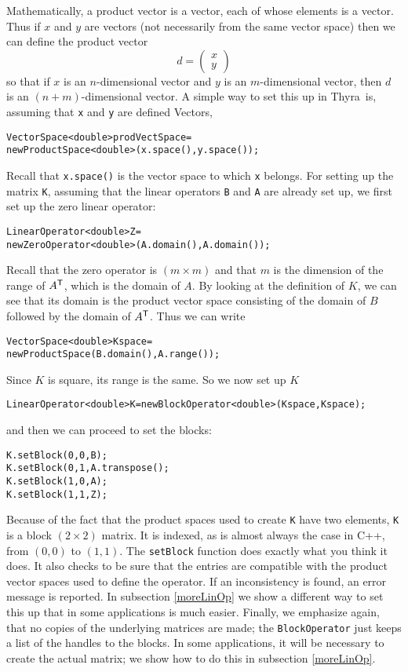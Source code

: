 \documentclass[12pt]{article}
\newcommand{\bd}{\begin{displaymath}}
\newcommand{\ed}{\end{displaymath}}
\newcommand{\trp}{^{\sf T}}
\newcommand{\bry}{\begin{array}}
\newcommand{\ery}{\end{array}}
\newcommand{\thyra}{{\sf Thyra}}
\newcommand{\cpp}{{\sf C++}}
\renewcommand{\vector}{{\sf Vector}}
\newcommand{\lcode}[1]{{\tt #1}}
\newenvironment{dcode}{  \begin{center} 
    \begin{minipage}{.9\textwidth}
     \begin{alltt}}
{\end{alltt}
    \end{minipage}
  \end{center}}
\newcommand{\bdcode}{\begin{dcode}}
\newcommand{\edcode}{\end{dcode}}
\begin{document}
Mathematically, a product vector is a vector, each of whose
elements is a vector.  Thus if $x$ and $y$ are vectors (not
necessarily from the same vector space) then we can define the product
vector
\bd
     d = \left( \bry{c} x \\ y \ery \right)
\ed
so that if $x$ is an $n$-dimensional vector and $y$ is an
$m$-dimensional vector, then $d$ is an $(n+ m)$-dimensional vector.  A
simple way to set this up in \thyra\ is, assuming that \lcode{x} and
\lcode{y} are defined \vector s, 
\bdcode
VectorSpace<double> prodVectSpace = 
      new ProductSpace<double>(x.space(), y.space()); 
\edcode
Recall that \lcode{x.space()} is the vector space to which \lcode{x}
belongs. For setting up the matrix \lcode{K}, assuming that the linear
operators \lcode{B} and \lcode{A} are already set up, we first set up
the zero linear operator:
\bdcode
LinearOperator<double> Z = 
     new ZeroOperator<double>(A.domain(), A.domain());
\edcode
Recall that the zero operator is $(m \times m)$ and that $m$ is the
dimension of the range of $A\trp$, which is the domain of $A$.  By
looking at the definition of $K$, we can see that its domain is the
product vector space consisting of the domain of $B$ followed by the
domain of $A\trp$.  Thus we can write
\bdcode
VectorSpace<double> Kspace = 
     new ProductSpace(B.domain(), A.range());
\edcode
Since $K$ is square, its range is the same.  So we now set up $K$
\bdcode
LinearOperator<double> K = new BlockOperator<double>(Kspace, Kspace);
\edcode
and then we can proceed to set the blocks:
\bdcode
K.setBlock(0, 0, B); 
K.setBlock(0, 1, A.transpose(); 
K.setBlock(1, 0, A); 
K.setBlock(1, 1, Z);
\edcode
Because of the fact that the product spaces used to create \lcode{K}
have two elements, \lcode{K} is a block $(2 \times 2)$ matrix.  It is
indexed, as is almost always the case in \cpp, from $(0, 0)$ to $(1,
1)$.  The \lcode{setBlock} function does exactly what you think it
does.  It also checks to be sure that the entries are compatible with
the product vector spaces used to define the operator.  If an
inconsistency is found, an error message is reported.  In subsection
\ref{moreLinOp} we show a different way to set this up that in some
applications is much easier.  Finally, we emphasize again, that no
copies of the underlying matrices are made; the \lcode{BlockOperator}
just keeps a list of the handles to the blocks.  In some applications,
it will be necessary to create the actual matrix; we show how to do
this in subsection \ref{moreLinOp}.
\end{document}

